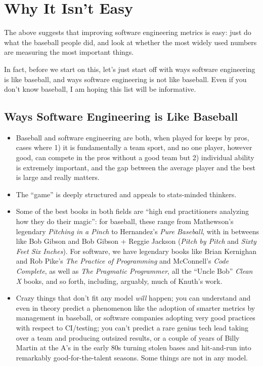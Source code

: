 \documentclass[sigplan,screen]{acmart}
\begin{document}
\section{Why It Isn't Easy}

The above suggests that improving software engineering metrics is
easy:  just do what the baseball people did, and look at whether the
most widely used numbers are measuring the most important things.  

In fact, before we start on this, let's just start off with ways
software engineering is like baseball, and ways software engineering
is not like baseball.  Even if you don't know baseball, I am hoping
this list will be informative.

\subsection{Ways Software Engineering is Like Baseball}
\begin{itemize}
  \item Baseball and software engineering are both, when played for
    keeps by pros, cases where 1) it is fundamentally a team sport,
    and no one player, however good, can compete in the pros without a
    good team but 2)
    individual ability is extremely important, and the gap between the
    average player and the best is large and really matters.
    \item The ``game''  is deeply structured and appeals to
      stats-minded thinkers.
 
        \item Some of the best books in both fields are ``high end
          practitioners analyzing how they do their magic'':  for
          baseball, these range from Mathewson's legendary
          \emph{Pitching in a Pinch} to Hernandez's \emph {Pure
            Baseball}, with in betweens like Bob Gibson and Bob Gibson
          + Reggie Jackson (\emph{Pitch by Pitch} and \emph{Sixty Feet
            Six Inches}).  For software, we have legendary books like Brian Kernighan and
          Rob Pike's \emph{The Practice of Programming} and McConnell's
          \emph{Code Complete},  as well as \emph{The Pragmatic Programmer}, all
          the ``Uncle Bob'' \emph{Clean X} books, and so forth,
          including, arguably, much of Knuth's work.
          \item Crazy things that don't fit any model \emph{will}
            happen; you can understand and even in theory predict a
            phenomenon like the adoption of smarter metrics by
            management in baseball, or software companies adopting
            very good practices with respect to CI/testing; you can't
           predict a rare genius tech lead taking over a team and
           producing outsized results, or a couple of years of Billy
           Martin at the A's in the early 80s turning stolen bases and
           hit-and-run into remarkably good-for-the-talent seasons.
           Some things are not in any model.
         \end{itemize}
\end{document}
